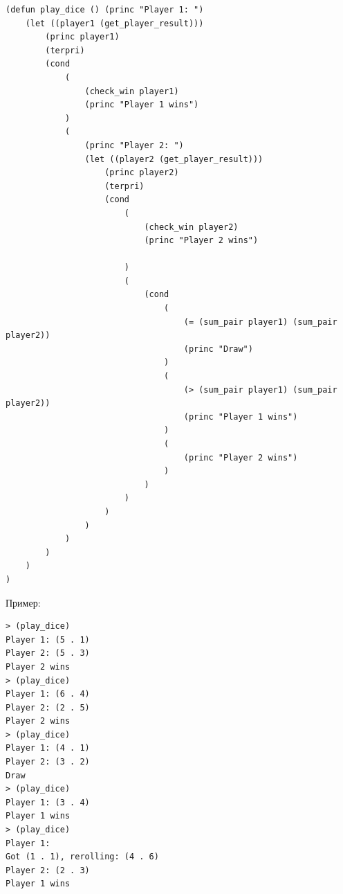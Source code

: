\newpage
\vspace*{10mm}
\begin{lstlisting}[caption=Функция игры в кости]
(defun play_dice () (princ "Player 1: ")
	(let ((player1 (get_player_result)))
		(princ player1)
		(terpri)
		(cond 
			(
				(check_win player1)
				(princ "Player 1 wins")
			)
			(
				(princ "Player 2: ")
				(let ((player2 (get_player_result)))
					(princ player2)
					(terpri)
					(cond 
						(
							(check_win player2)
							(princ "Player 2 wins")
		     
						)
						(
							(cond 
								(
									(= (sum_pair player1) (sum_pair player2))
									(princ "Draw")
								)
								(
									(> (sum_pair player1) (sum_pair player2))
									(princ "Player 1 wins")
								)
								(
									(princ "Player 2 wins")
								)
							)
						)
					)
				)
			)
		)
	)
)
\end{lstlisting}

\newpage
\vspace*{10mm}
Пример:
\begin{lstlisting}
> (play_dice)
Player 1: (5 . 1)
Player 2: (5 . 3)
Player 2 wins
> (play_dice)
Player 1: (6 . 4)
Player 2: (2 . 5)
Player 2 wins
> (play_dice)
Player 1: (4 . 1)
Player 2: (3 . 2)
Draw
> (play_dice)
Player 1: (3 . 4)
Player 1 wins
> (play_dice)
Player 1: 
Got (1 . 1), rerolling: (4 . 6)
Player 2: (2 . 3)
Player 1 wins
\end{lstlisting}
